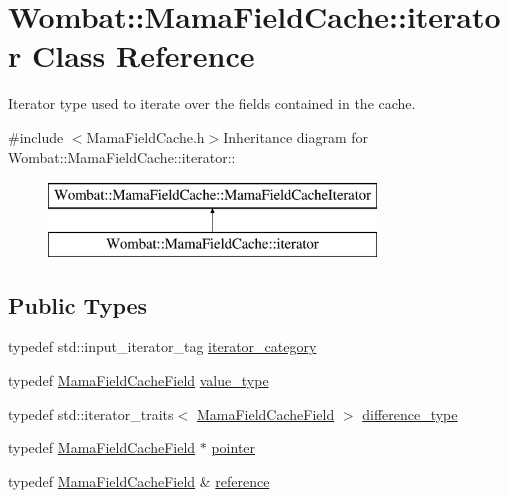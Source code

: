 \hypertarget{classWombat_1_1MamaFieldCache_1_1iterator}{
\section{Wombat::MamaFieldCache::iterator Class Reference}
\label{classWombat_1_1MamaFieldCache_1_1iterator}
}


Iterator type used to iterate over the fields contained in the cache.  


{\ttfamily \#include $<$MamaFieldCache.h$>$}Inheritance diagram for Wombat::MamaFieldCache::iterator::\begin{figure}[H]
\begin{center}
\leavevmode
\includegraphics[height=2cm]{classWombat_1_1MamaFieldCache_1_1iterator}
\end{center}
\end{figure}
\subsection*{Public Types}
\begin{DoxyCompactItemize}
\item 
typedef std::input\_\-iterator\_\-tag \hyperlink{classWombat_1_1MamaFieldCache_1_1iterator_ab9a965491e48470861289df0bb701009}{iterator\_\-category}
\item 
typedef \hyperlink{classWombat_1_1MamaFieldCacheField}{MamaFieldCacheField} \hyperlink{classWombat_1_1MamaFieldCache_1_1iterator_a82b7aadbb750ea23f20f1eb008d5d21d}{value\_\-type}
\item 
typedef std::iterator\_\-traits$<$ \hyperlink{classWombat_1_1MamaFieldCacheField}{MamaFieldCacheField} $>$ \hyperlink{classWombat_1_1MamaFieldCache_1_1iterator_aeebd60ba5425667155c47979ee7dd632}{difference\_\-type}
\item 
typedef \hyperlink{classWombat_1_1MamaFieldCacheField}{MamaFieldCacheField} $\ast$ \hyperlink{classWombat_1_1MamaFieldCache_1_1iterator_ac974845fb0c4d7a2275fdd32c1c643c6}{pointer}
\item 
typedef \hyperlink{classWombat_1_1MamaFieldCacheField}{MamaFieldCacheField} \& \hyperlink{classWombat_1_1MamaFieldCache_1_1iterator_a61360a7be022b1d37777fc56614cca55}{reference}
\end{DoxyCompactItemize}
